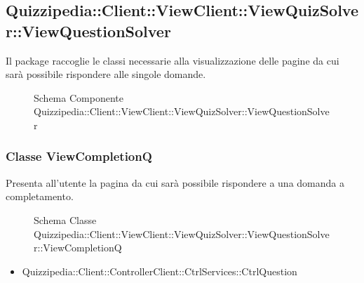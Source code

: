 \subsection{Quizzipedia::Client::ViewClient::ViewQuizSolver::ViewQuestionSolver}
Il package raccoglie le classi necessarie alla visualizzazione delle pagine da cui sarà possibile rispondere alle singole domande.
\begin{figure}[H]
\centering
\noindent{}
\caption[Schema Componente Quizzipedia::Client::ViewClient::ViewQuizSolver::ViewQuestionSolver]{Schema Componente Quizzipedia::Client::ViewClient::ViewQuizSolver::ViewQuestionSolver}
\end{figure}
\subsubsection{Classe ViewCompletionQ}
Presenta all'utente la pagina da cui sarà possibile rispondere a una domanda a completamento.
\begin{figure}[H]
\centering
\noindent{}
\caption[Schema Classe ViewCompletionQ]{Schema Classe Quizzipedia::Client::ViewClient::ViewQuizSolver::ViewQuestionSolver::ViewCompletionQ}
\end{figure}
\begin{itemize}
\item Quizzipedia::Client::ControllerClient::CtrlServices::CtrlQuestion
\end{itemize}
